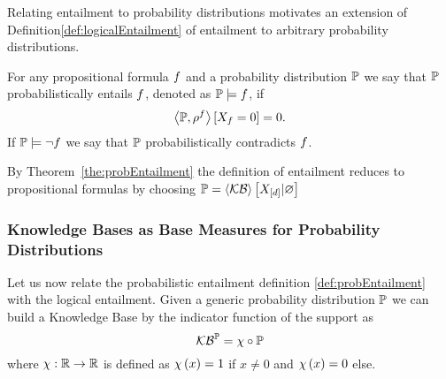 %
Relating entailment to probability distributions motivates an extension of Definition\ref{def:logicalEntailment} of entailment to arbitrary probability distributions.


\begin{definition}\label{def:probEntailment}
	For any propositional formula $f$ and a probability distribution $\mathbb{P}$ we say that $\mathbb{P}$ probabilistically entails $f$, denoted as $\mathbb{P}\models f$, if
		\[ \left\langle \mathbb{P},\rho^{f}\right\rangle \left[ X_{f}=0 \right] = 0 . \]
	If $\mathbb{P}\models\lnot f$ we say that $\mathbb{P}$ probabilistically contradicts $f$.
\end{definition}

%
By Theorem~\ref{the:probEntailment} the definition of entailment reduces to propositional formulas by choosing $\mathbb{P}=\left\langle \mathcal{KB}\right\rangle \left[ X_{[d]} | \varnothing \right]$









\subsubsection{Knowledge Bases as Base Measures for Probability Distributions}



Let us now relate the probabilistic entailment definition \ref{def:probEntailment} with the logical entailment.
Given a generic probability distribution $\mathbb{P}$ we can build a Knowledge Base by the indicator function of the support as 
	\[ \mathcal{KB}^{\mathbb{P}} = \chi \circ \mathbb{P} \]
where $\chi:\mathbb{R}\rightarrow \mathbb{R}$ is defined as $\chi\left(x\right)=1$ if $x\neq0$ and $\chi\left(x\right)=0$ else.

